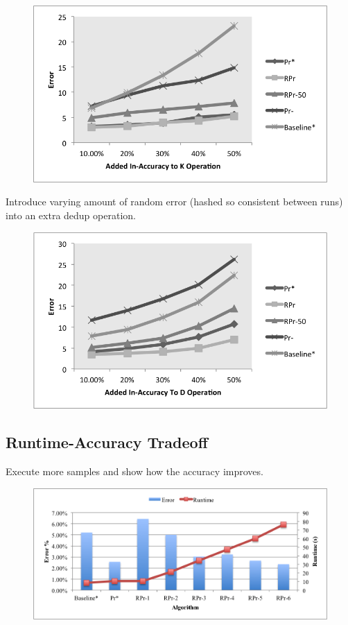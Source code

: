 \begin{figure}[ht]
\centering
\includegraphics[scale=0.5]{fig2.png}
\caption{}
\label{exp:ms-academic-ranking}
\end{figure}

Introduce varying amount of random error (hashed so consistent between runs) into an extra dedup operation.

\begin{figure}[ht]
\centering
\includegraphics[scale=0.5]{fig3.png}
\caption{}
\label{exp:ms-academic-ranking}
\end{figure}

\subsection{Runtime-Accuracy Tradeoff}
Execute more samples and show how the accuracy improves.

\begin{figure}[ht]
\centering
\includegraphics[scale=0.5]{fig4.png}
\caption{}
\label{exp:ms-academic-ranking}
\end{figure}


